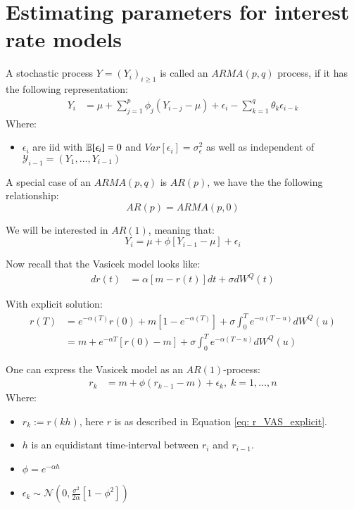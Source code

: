 \chapter{Estimating parameters for interest rate models} 

\begin{definition}
A stochastic process $Y = (Y_{i})_{i\geq 1}$ is called an $ARMA(p,q)$ process, if it has the following representation: 
\begin{align*}
Y_{i} &= \mu + \sum_{j=1}^{p}\phi_{j}(Y_{i-j}-\mu) + \epsilon_{i} - \sum_{k=1}^{q}\theta_{k}\epsilon_{i-k} \end{align*}
Where: 
\begin{itemize}[leftmargin =*]
    \item $\epsilon_{i}$ are iid with $\mathbb{E}[\epsilon_{i}] = 0$ and $Var[\epsilon_{i}] = \sigma_{\epsilon}^{2}$ as well as independent of \\ 
    $\mathcal{Y}_{i-1} = (Y_{1}, \dots, Y_{i-1})$
\end{itemize}
\end{definition}


A special case of an $ARMA(p,q)$ is $AR(p)$, we have the the following relationship: 
\[
AR(p) = ARMA(p,0)
\]

We will be interested in $AR(1)$, meaning that: 
\[
Y_{i} = \mu + \phi[Y_{i-1}-\mu] + \epsilon_{i}
\]


Now recall that the Vasicek model looks like:
\begin{align*}
dr(t) &= \alpha[m - r(t)]dt + \sigma dW^{Q}(t)    
\end{align*}

With explicit solution:
\begin{align}
\label{eq: r_VAS_explicit}
r(T) &= e^{-\alpha(T)}r(0) + m[1-e^{-\alpha(T)}] 
+ \sigma \int_{0}^{T}e^{-\alpha(T-u)}dW^{Q}(u) \nonumber \\ 
&= 
m + e^{-\alpha T}\left[r(0) -m \right]
+ \sigma \int_{0}^{T}e^{-\alpha(T-u)}dW^{Q}(u)
\end{align} 


\begin{proposition}
One can express the Vasicek model as an $AR(1)$-process: 
\begin{align*}
r_{k} &= m + \phi (r_{k-1}-m) + \epsilon_{k}, \; k = 1, \dots, n     
\end{align*}
Where:
\begin{itemize}[leftmargin =*]
    \item $r_{k} := r(kh)$, here $r$ is as described in Equation \ref{eq: r_VAS_explicit}. 
    \item $h$ is an equidistant time-interval between $r_{i}$ and $r_{i-1}$. 
    \item $\phi = e^{-\alpha h}$
    \item $\epsilon_{k} \sim \mathcal{N}\left(
    0, \frac{\sigma^{2}}{2\alpha}\left[
    1-\phi^{2}
    \right]\right)$
\end{itemize}
\end{proposition}

